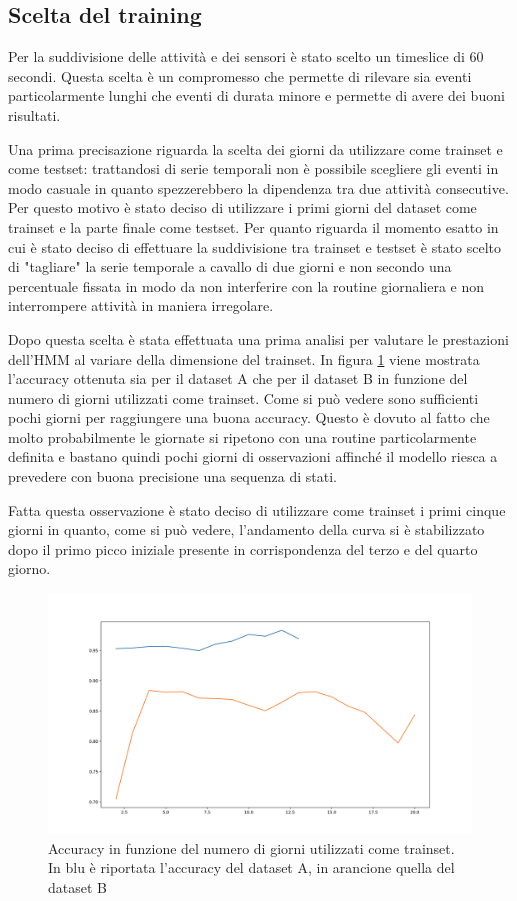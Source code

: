 \documentclass[10pt,a4paper]{article}
\begin{document}
	\subsection{Scelta del training}
		
	Per la suddivisione delle attività e dei sensori è stato scelto un timeslice di 60 secondi. Questa scelta è un compromesso che permette di rilevare sia eventi particolarmente lunghi che eventi di durata minore e permette di avere dei buoni risultati.
	
	Una prima precisazione riguarda la scelta dei giorni da utilizzare come trainset e come testset: trattandosi di serie temporali non è possibile scegliere gli eventi in modo casuale in quanto spezzerebbero la dipendenza tra due attività consecutive. Per questo motivo è stato deciso di utilizzare i primi giorni del dataset come trainset e la parte finale come testset.	
	Per quanto riguarda il momento esatto in cui è stato deciso di effettuare la suddivisione tra trainset e testset è stato scelto di "tagliare" la serie temporale a cavallo di due giorni e non secondo una percentuale fissata in modo da non interferire con la routine giornaliera e non interrompere attività in maniera irregolare.
	
	Dopo questa scelta è stata effettuata una prima analisi per valutare le prestazioni dell'HMM al variare della dimensione del trainset. In figura \ref{fig:traintestrate} viene mostrata l'accuracy ottenuta sia per il dataset A che per il dataset B in funzione del numero di giorni utilizzati come trainset.
	Come si può vedere sono sufficienti pochi giorni per raggiungere una buona accuracy. Questo è dovuto al fatto che molto probabilmente le giornate si ripetono con una routine particolarmente definita e bastano quindi pochi giorni di osservazioni affinché il modello riesca a prevedere con buona precisione una sequenza di stati.
	
	Fatta questa osservazione è stato deciso di utilizzare come trainset i primi cinque giorni in quanto, come si può vedere, l'andamento della curva si è stabilizzato dopo il primo picco iniziale presente in corrispondenza del terzo e del quarto giorno. 
	
	\begin{figure}[!htb]
	\includegraphics[width=\linewidth]{immagini/traintestrate.png}
	\caption{Accuracy in funzione del numero di giorni utilizzati come trainset. In blu è riportata l'accuracy del dataset A, in arancione quella del dataset B}
	\label{fig:traintestrate}
	\end{figure}
	
\end{document}
